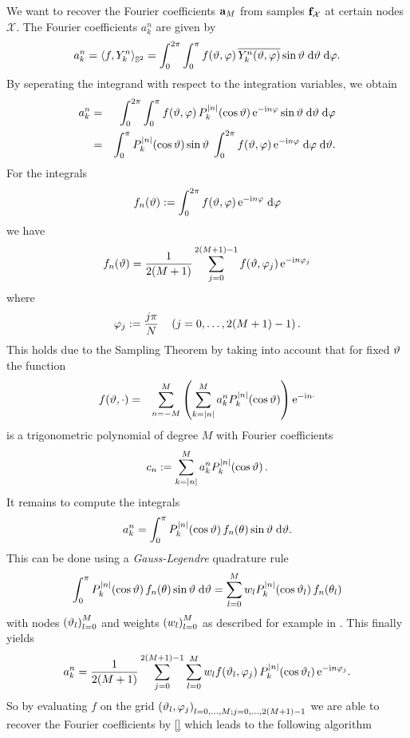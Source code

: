 We want to recover the Fourier coefficients $\mathbf{a}_{M}$ from samples $\mathbf{f}_{\mathcal{X}}$ at certain nodes $\mathcal{X}$. The 
Fourier coefficients $a_{k}^n$ are given by
$$
  a_{k}^n = \left<f,Y_{k}^n\right>_{\mathbb{S}^2} = \int_{0}^{2\pi} \int_{0}^{\pi} f{\hspace{-0.4ex}}\left(\vartheta,\varphi\right) \overline{Y_{k}^n{\hspace{-0.4ex}}\left(\vartheta,\varphi\right)} \sin \vartheta \; \text{\rm{d}} \vartheta \; \text{\rm{d}} \varphi.
$$
By seperating the integrand with respect to the integration variables, we obtain
\begin{eqnarray*}
  a_{k}^n & = & \int_{0}^{2\pi} \int_{0}^{\pi} f{\hspace{-0.4ex}}\left(\vartheta,\varphi\right) P_{k}^{\left\vert n\right\vert}{\hspace{-0.4ex}}\left(\cos \vartheta\right) \mbox{\rm{e}}^{-\mbox{\scriptsize\rm{i}} n \varphi} \sin \vartheta \; \text{\rm{d}} \vartheta \; \text{\rm{d}} \varphi\\
          & = & \int_{0}^{\pi} P_{k}^{\left\vert n\right\vert}{\hspace{-0.4ex}}\left(\cos \vartheta\right) \sin \vartheta \; \int_{0}^{2\pi} f{\hspace{-0.4ex}}\left(\vartheta,\varphi\right) \mbox{\rm{e}}^{-\mbox{\scriptsize\rm{i}} n \varphi} \; \text{\rm{d}} \varphi \; \text{\rm{d}} \vartheta.
\end{eqnarray*}
For the integrals 
$$
  f_{n}{\hspace{-0.4ex}}\left(\vartheta\right) := \int_{0}^{2\pi} f{\hspace{-0.4ex}}\left(\vartheta,\varphi\right) \mbox{\rm{e}}^{-\mbox{\scriptsize\rm{i}} n \varphi} \; \text{\rm{d}} \varphi
$$
we have
$$ f_{n}{\hspace{-0.4ex}}\left(\vartheta\right) = \frac{1}{2(M+1)} \sum_{j=0}^{2(M+1)-1} f{\hspace{-0.4ex}}\left(\vartheta,\varphi_{j}\right) \mbox{\rm{e}}^{-\mbox{\scriptsize\rm{i}} n \varphi_{j}}$$
where
$$ \varphi_{j} := \frac{j\pi}{N} \quad \left(j=0,\ldots,2(M+1)-1\right). $$
This holds due to the Sampling Theorem by taking into account that for fixed $\vartheta$ the function
\begin{eqnarray*}
  f{\hspace{-0.4ex}}\left(\vartheta,\cdot\right) & = & \sum_{n=-M}^{M} \left(\sum_{k=\left\vert n\right\vert}^M a_{k}^n P_{k}^{\left\vert n\right\vert}{\hspace{-0.4ex}}\left(\cos \vartheta\right)\right) \mbox{\rm{e}}^{-\mbox{\scriptsize\rm{i}} n \cdot}\\
\end{eqnarray*}
is a trigonometric polynomial of degree $M$ with Fourier coefficients
$$
  c_{n} := \sum_{k=\left\vert n\right\vert}^M a_{k}^n P_{k}^{\left\vert n\right\vert}{\hspace{-0.4ex}}\left(\cos \vartheta\right).
$$
It remains to compute the integrals
$$
  a_{k}^n = \int_{0}^{\pi} P_{k}^{\left\vert n\right\vert}{\hspace{-0.4ex}}\left(\cos \vartheta\right) f_{n}{\hspace{-0.4ex}}\left(\theta\right) \sin \vartheta \; \text{\rm{d}} \vartheta.
$$
This can be done using a \emph{Gauss-Legendre} quadrature rule
$$
  \int_{0}^{\pi} P_{k}^{\left\vert n\right\vert}{\hspace{-0.4ex}}\left(\cos \vartheta\right) f_{n}{\hspace{-0.4ex}}\left(\theta\right) \sin \vartheta \; \text{\rm{d}} \vartheta = \sum_{l=0}^{M} w_{l} P_{k}^{\left\vert n\right\vert}{\hspace{-0.4ex}}\left(\cos \vartheta_{l}\right) f_{n}{\hspace{-0.4ex}}\left(\theta_{l}\right) 
$$
with nodes $\left(\vartheta_{l}\right)_{l=0}^M$ and weights $\left(w_{l}\right)_{l=0}^M$ as described for example in \cite{???}. This finally yields
\begin{equation}
  a_{k}^n = \frac{1}{2(M+1)} \sum_{j=0}^{2(M+1)-1} \sum_{l=0}^{M} w_{l} f{\hspace{-0.4ex}}\left(\vartheta_{l},\varphi_{j}\right) P_{k}^{\left\vert n\right\vert}{\hspace{-0.4ex}}\left(\cos \vartheta_{l}\right) \mbox{\rm{e}}^{-\mbox{\scriptsize\rm{i}} n \varphi_{j}}.
\end{equation}
So by evaluating $f$ on the grid $\left(\vartheta_{l},\varphi_{j}\right)_{l=0,\ldots,M;j=0,\ldots,2(M+1)-1}$ we are able to recover the Fourier coefficients by \eqref{} which leads to the following algorithm


